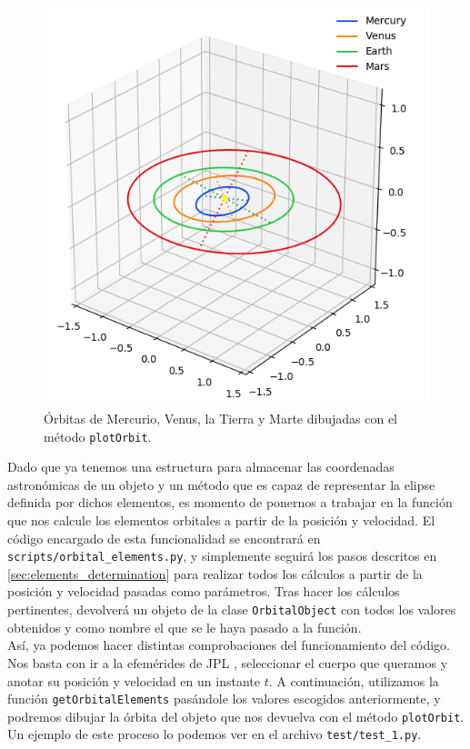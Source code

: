 \begin{figure}[H]
\centering
\includegraphics[scale=0.4]{images/plot_example.png}
\caption{Órbitas de Mercurio, Venus, la Tierra y Marte dibujadas con el método \texttt{plotOrbit}.}
\label{fig:plot_example}
\end{figure}


Dado que ya tenemos una estructura para almacenar las coordenadas astronómicas de un objeto y un método que es capaz de representar la elipse definida por dichos elementos, es momento de ponernos a trabajar en la función que nos calcule los elementos orbitales a partir de la posición y velocidad. El código encargado de esta funcionalidad se encontrará en \texttt{scripts/orbital\_elements.py}, y simplemente seguirá los pasos descritos en \ref{sec:elements_determination} para realizar todos los cálculos a partir de la posición y velocidad pasadas como parámetros. Tras hacer los cálculos pertinentes, devolverá un objeto de la clase \texttt{OrbitalObject} con todos los valores obtenidos y como nombre el que se le haya pasado a la función.\\

Así, ya podemos hacer distintas comprobaciones del funcionamiento del código. Nos basta con ir a la efemérides de JPL \cite{jpl}, seleccionar el cuerpo que queramos y anotar su posición y velocidad en un instante $t$. A continuación, utilizamos la función \texttt{getOrbitalElements} pasándole los valores escogidos anteriormente, y podremos dibujar la órbita del objeto que nos devuelva con el método \texttt{plotOrbit}. Un ejemplo de este proceso lo podemos ver en el archivo \texttt{test/test\_1.py}.\\

